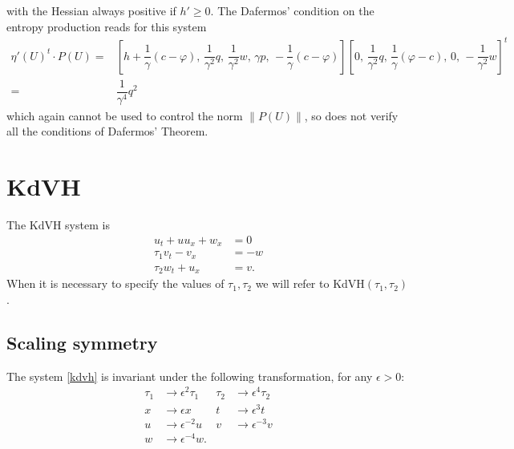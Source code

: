 \documentclass{article}
\theoremstyle{plain}
\theoremstyle{definition}
\numberwithin{theorem}{section}
\begin{document}
with the Hessian always positive if $h'\ge 0$. The Dafermos' condition on the entropy production  reads for this system
$$
\begin{aligned}
\eta'(U)^t\cdot P(U) = &[h+ \dfrac{1}{\gamma } (c-\varphi),\,  \dfrac{1}{\gamma^2 }q,\,  \dfrac{1}{\gamma^2 }w,\, \gamma p,\,    -\dfrac{1}{\gamma } (c-\varphi) ]
[0,\,  \dfrac{1}{\gamma^2 }q,\,  \dfrac{1}{\gamma }(\varphi-c),\, 0,\,    -\dfrac{1}{\gamma^2 } w ]^t\\= &
 \dfrac{1}{\gamma^4 }q^2
\end{aligned}
$$
which again cannot be used to control the norm $\|P(U)\|$, so does not verify all the conditions of Dafermos' Theorem.



\section{KdVH}

The KdVH system is
\begin{subequations} \label{kdvh}
\begin{align}
    u_t + uu_x + w_x & = 0 \\
    \tau_1 v_t - v_x & = -w \\
    \tau_2 w_t + u_x & = v.
\end{align}
\end{subequations}
When it is necessary to specify the values of $\tau_1, \tau_2$ we will
refer to KdVH$(\tau_1,\tau_2)$.

\subsection{Scaling symmetry}
The system \eqref{kdvh} is invariant under the following
transformation, for any $\epsilon>0$:
\begin{subequations}
\label{eq:scaling}
\begin{align}
    \tau_1 & \to \epsilon^2 \tau_1 & \tau_2 & \to \epsilon^4 \tau_2 \\
    x & \to \epsilon x & t & \to \epsilon^3 t \\
    u & \to \epsilon^{-2} u & v & \to \epsilon^{-3} v \\
    w & \to \epsilon^{-4} w.
\end{align}
\end{subequations}
\end{document}

